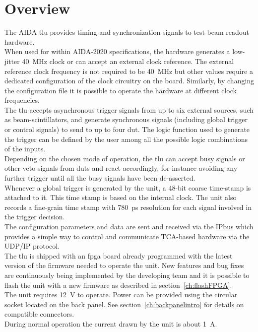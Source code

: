 \section{Overview}
The AIDA \gls{tlu} provides timing and synchronization signals to test-beam readout hardware.\\
When used for within AIDA-2020 specifications, the hardware generates a low-jitter 40~MHz clock or can accept an external clock reference. The external reference clock frequency is not required to be 40~MHz but other values require a dedicated configuration of the clock circuitry on the board. Similarly, by changing the configuration file it is possible to operate the hardware at different clock frequencies.\\
The \gls{tlu} accepts asynchronous trigger signals from up to six external sources, such as beam-scintillators, and generate synchronous signals (including global trigger or control signals) to send to up to four \gls{dut}. The logic function used to generate the trigger can be defined by the user among all the possible logic combinations of the inputs.\\
Depending on the chosen mode of operation, the \gls{tlu} can accept busy signals or other veto signals from \gls{dut}s and react accordingly, for instance avoiding any further trigger until all the busy signals have been de-asserted.\\
Whenever a global trigger is generated by the unit, a 48-bit coarse time-stamp is attached to it. This time stamp is based on the internal clock. The unit also records a fine-grain time stamp with 780~ps resolution for each signal involved in the trigger decision.\\
The configuration parameters and data are sent and received via the \href{https://www.ohwr.org/projects/ipbus}{IPbus} which provides a simple way to control and communicate TCA-based hardware via the UDP/IP protocol.\\
The \gls{tlu} is shipped with an \gls{fpga} board already programmed with the latest version of the firmware needed to operate the unit. New features and bug fixes are continuously being implemented by the developing team and it is possible to flash the unit with a new firmware as described in section~\ref{ch:flashFPGA}.\\
The unit requires 12~V to operate. Power can be provided using the circular socket located on the back panel. See section~\ref{ch:backpanelintro} for details on compatible connectors.\\
During normal operation the current drawn by the unit is about 1~A.\\

